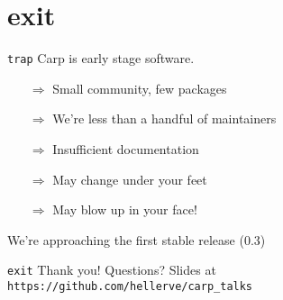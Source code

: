 \documentclass[aspectratio=169]{beamer}
\begin{document}
  \section{exit}
  \begin{frame}{\texttt{trap}}
    Carp is early stage software.
    \begin{itemize}
      \item[$\Rightarrow$] Small community, few packages
      \item[$\Rightarrow$] We’re less than a handful of maintainers
      \item[$\Rightarrow$] Insufficient documentation
      \item[$\Rightarrow$] May change under your feet
      \item[$\Rightarrow$] May blow up in your face!
    \end{itemize}
    We’re approaching the first stable release (0.3)
  \end{frame}
%
  \begin{frame}{\texttt{exit}}
    \Huge Thank you!
    \linebreak
    \linebreak
    \linebreak
    \small Questions?
    \linebreak
    \linebreak
    \tiny Slides at \texttt{https://github.com/hellerve/carp\_talks}
  \end{frame}
\end{document}
